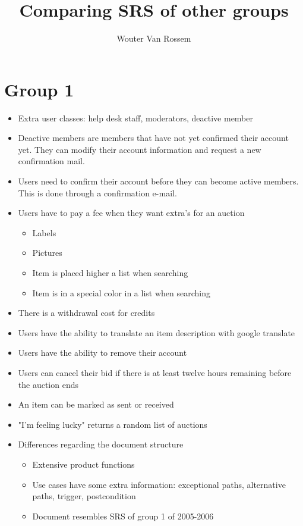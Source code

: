 \documentclass[10pt,a4paper]{article}
\author{Wouter Van Rossem}
\title{Comparing SRS of other groups}
\begin{document}
\maketitle

\section{Group 1}

\begin{itemize}
	\item Extra user classes: help desk staff, moderators, deactive member
	\item Deactive members are members that have not yet confirmed their account yet. They can modify their account information and request a new confirmation mail.
	\item Users need to confirm their account before they can become active members. This is done through a confirmation e-mail. 
	\item Users have to pay a fee when they want extra's for an auction
		\begin{itemize}
			\item Labels
			\item Pictures
			\item Item is placed higher a list when searching
			\item Item is in a special color in a list when searching
		\end{itemize}  
	\item There is a withdrawal cost for credits
	\item Users have the ability to translate an item description with google translate
	\item Users have the ability to remove their account
	\item Users can cancel their bid if there is at least twelve hours remaining before the auction ends
	\item An item can be marked as sent or received
	\item "I'm feeling lucky" returns a random list of auctions
	\item Differences regarding the document structure
		\begin{itemize}
			\item Extensive product functions
			\item Use cases have some extra information: exceptional paths, alternative paths, trigger, postcondition
			\item Document resembles SRS of group 1 of 2005-2006
		\end{itemize}
\end{itemize}
\end{document}
